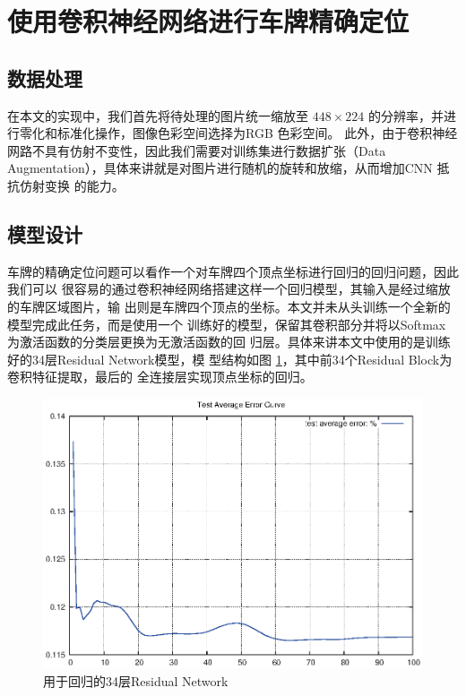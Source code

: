 \section{使用卷积神经网络进行车牌精确定位}

\subsection{数据处理}

在本文的实现中，我们首先将待处理的图片统一缩放至 $448 \times 224$ 的分辨率，并进
行零化和标准化操作，图像色彩空间选择为RGB 色彩空间。
此外，由于卷积神经网路不具有仿射不变性，因此我们需要对训练集进行数据扩张（Data
Augmentation），具体来讲就是对图片进行随机的旋转和放缩，从而增加CNN 抵抗仿射变换
的能力。

\subsection{模型设计}

车牌的精确定位问题可以看作一个对车牌四个顶点坐标进行回归的回归问题，因此我们可以
很容易的通过卷积神经网络搭建这样一个回归模型，其输入是经过缩放的车牌区域图片，输
出则是车牌四个顶点的坐标。本文并未从头训练一个全新的模型完成此任务，而是使用一个
训练好的模型，保留其卷积部分并将以Softmax 为激活函数的分类层更换为无激活函数的回
归层。具体来讲本文中使用的是训练好的34层Residual Network\cite{He:2015tt}模型，模
型结构如图 \ref{Fig:ResNet34Reg}，其中前34个Residual Block为卷积特征提取，最后的
全连接层实现顶点坐标的回归。

\begin{figure}[ht]
  \centering
  \includegraphics[width=0.8\linewidth]{./Figure/ResNet34Reg.eps}
  \caption{用于回归的34层Residual Network}\label{Fig:ResNet34Reg}
\end{figure}

